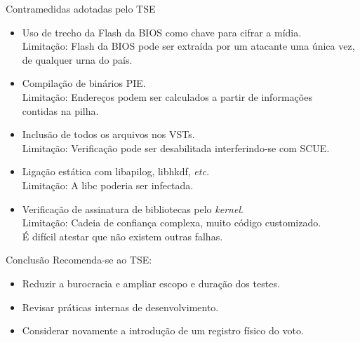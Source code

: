 \documentclass[10pt,xcolor={dvipsnames}]{beamer}
\begin{document}
\begin{frame}{Contramedidas adotadas pelo TSE}
  \begin{itemize}
    \item Uso de trecho da Flash da BIOS como chave para cifrar a mídia.\\
        {\small \alert{Limitação}: Flash da BIOS pode ser extraída por um atacante uma única vez, de qualquer urna do país.}\\[1em]
    \item Compilação de binários PIE.\\
        {\small \alert{Limitação}: Endereços podem ser calculados a partir de informações\\contidas na pilha.}\\[1em]
    \item Inclusão de todos os arquivos nos VSTs.\\
        {\small \alert{Limitação}: Verificação pode ser desabilitada interferindo-se com SCUE.}\\[1em]
    \item Ligação estática com libapilog, libhkdf, \textit{etc.}\\
        {\small \alert{Limitação}: A libc poderia ser infectada.}\\[1em]
    \item Verificação de assinatura de bibliotecas pelo \textit{kernel}.\\
        {\small \alert{Limitação}: Cadeia de confiança complexa, muito código customizado.\\É difícil atestar que não existem outras falhas.}
  \end{itemize}
\end{frame}


\begin{frame}{Conclusão}
  Recomenda-se ao TSE:
  \begin{itemize}
    \item Reduzir a burocracia e ampliar escopo e duração dos testes.
    \item Revisar práticas internas de desenvolvimento.
    \item Considerar novamente a introdução de um registro físico do voto.
  \end{itemize}
\end{frame}
\end{document}

